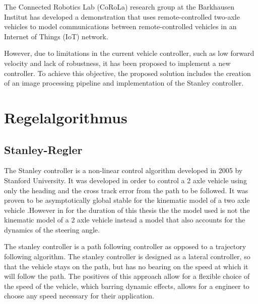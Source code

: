 \documentclass[arbeit=studie,oneside,BCOR=12mm]{ArbeitRST}
\begin{document}
The Connected Robotics Lab (CoRoLa) research group at the Barkhausen Institut
has developed a demonstration that uses remote-controlled two-axle vehicles to
model communications between remote-controlled vehicles in an Internet of Things (IoT) network.

However, due to limitations in the current vehicle controller, such as low
forward velocity and lack of robustness, it has been proposed to implement a
new controller. To achieve this objective, the proposed solution includes the
creation of an image processing pipeline and implementation of the Stanley
controller.

\iffalse
At the Connected Robotics Lab (CoRoLa) research group at the Barkhausen
Institut, a demonstration using remote controlled two axle vehicles was
developed. The demonstration is currently in use in order to model
communications between vehicles similar to an Internet of Things (IoT) network.

Due to issues regarding low forward velocity and robustness of the current
vehicle controller, it was proposed to implement a new 

In order to achieve the goals stated above, creation of an image processing
pipeline and implementation of the Stanley controller are proposed.
\fi


\chapter{Regelalgorithmus}

\section{Stanley-Regler}
\iffalse
The Stanley controller is a non-linear control algorithm developed in 2005 by
Stanford University. It was developed in order to control a 2 axle vehicle
using only the heading and the cross track error from the path to be followed.
It was proven to be asymptotically global stable for the kinematic model of a
two axle vehicle .However in for the duration of this thesis the the model used
is not the kinematic model of a 2 axle vehicle instead a model that also
accounts for the dynamics of the steering angle.

The stanley controller is a path following controller as opposed to a
trajectory following algorithm. The stanley controller is designed as a lateral
controller,  so that the vehicle stays on the path, but has no bearing on the
speed at which it will follow the path. The positives of this approach allow
for a flexible choice of the speed of the vehicle, which barring dynamic
effects, allows for a engineer to choose any speed necessary for their
application.
\end{document}
